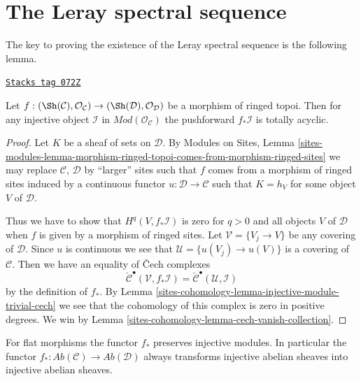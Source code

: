 \section{The Leray spectral sequence}
\label{sites-cohomology-section-leray}
The key to proving the existence of the Leray spectral sequence is
the following lemma.

\begin{lemma}
\label{sites-cohomology-lemma-direct-image-injective-sheaf}
\href{https://stacks.math.columbia.edu/tag/072Z}{\texttt{Stacks tag 072Z}}

Let $f : (\Sh(\mathcal{C}), \mathcal{O}_\mathcal{C}) \to
(\Sh(\mathcal{D}), \mathcal{O}_\mathcal{D})$ be a morphism of ringed topoi.
Then for any injective object $\mathcal{I}$ in
$\textit{Mod}(\mathcal{O}_\mathcal{C})$
the pushforward $f_*\mathcal{I}$ is totally acyclic.
\end{lemma}

\begin{proof}
Let $K$ be a sheaf of sets on $\mathcal{D}$.
By
Modules on Sites, Lemma
\ref{sites-modules-lemma-morphism-ringed-topoi-comes-from-morphism-ringed-sites}
we may replace $\mathcal{C}$, $\mathcal{D}$ by ``larger'' sites such
that $f$ comes from a morphism of ringed sites induced by a continuous
functor $u : \mathcal{D} \to \mathcal{C}$ such that
$K = h_V$ for some object $V$ of $\mathcal{D}$.

\medskip\noindent
Thus we have to show that $H^q(V, f_*\mathcal{I})$ is zero
for $q > 0$ and all objects $V$ of $\mathcal{D}$ when $f$ is given
by a morphism of ringed sites. Let $\mathcal{V} = \{V_j \to V\}$
be any covering of $\mathcal{D}$. Since $u$ is continuous we see that
$\mathcal{U} = \{u(V_j) \to u(V)\}$ is a covering of $\mathcal{C}$.
Then we have an equality of {\v C}ech complexes
$$
\check{\mathcal{C}}^\bullet(\mathcal{V}, f_*\mathcal{I})
=
\check{\mathcal{C}}^\bullet(\mathcal{U}, \mathcal{I})
$$
by the definition of $f_*$. By
Lemma \ref{sites-cohomology-lemma-injective-module-trivial-cech}
we see that the cohomology of this complex is zero in positive degrees.
We win by
Lemma \ref{sites-cohomology-lemma-cech-vanish-collection}.
\end{proof}

For flat morphisms the functor $f_*$ preserves injective modules.
In particular the functor
$f_* : \textit{Ab}(\mathcal{C}) \to \textit{Ab}(\mathcal{D})$ always
 transforms injective
abelian sheaves into injective abelian sheaves.

